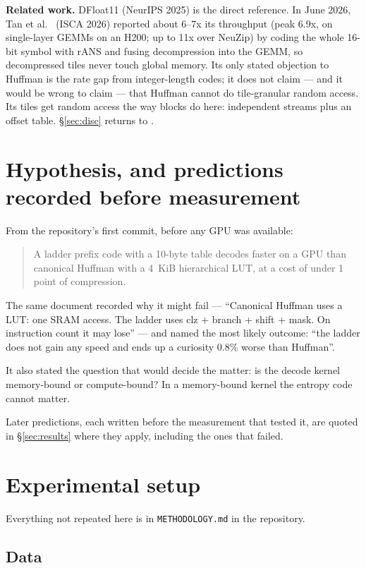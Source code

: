 \documentclass[11pt,a4paper]{article}
\newcommand{\code}[1]{\texttt{#1}}
\newcommand{\B}[1]{\textbf{#1}}
\begin{document}
\B{Related work.} DFloat11 \cite{dfloat11} (NeurIPS 2025) is the direct reference. In June 2026, Tan et al.\ \cite{shannon} (ISCA 2026) reported about 6--7x its throughput (peak 6.9x, on single-layer GEMMs on an H200; up to 11x over NeuZip) by coding the whole 16-bit symbol with rANS and fusing decompression into the GEMM, so decompressed tiles never touch global memory. Its only stated objection to Huffman is the rate gap from integer-length codes; it does not claim --- and it would be wrong to claim --- that Huffman cannot do tile-granular random access. Its tiles get random access the way blocks do here: independent streams plus an offset table. \S\ref{sec:disc} returns to \cite{shannon}.

\section{Hypothesis, and predictions recorded before measurement}

From the repository's first commit, before any GPU was available:

\begin{quote}
A ladder prefix code with a 10-byte table decodes faster on a GPU than canonical Huffman with a 4~KiB hierarchical LUT, at a cost of under 1 point of compression.
\end{quote}

The same document recorded why it might fail --- ``Canonical Huffman uses a LUT: one SRAM access. The ladder uses clz + branch + shift + mask. On instruction count it may lose'' --- and named the most likely outcome: ``the ladder does not gain any speed and ends up a curiosity 0.8\% worse than Huffman''.

It also stated the question that would decide the matter: is the decode kernel memory-bound or compute-bound? In a memory-bound kernel the entropy code cannot matter.

Later predictions, each written before the measurement that tested it, are quoted in \S\ref{sec:results} where they apply, including the ones that failed.

\section{Experimental setup}

Everything not repeated here is in \code{METHODOLOGY.md} in the repository.

\subsection{Data}\label{sec:data}
\end{document}
